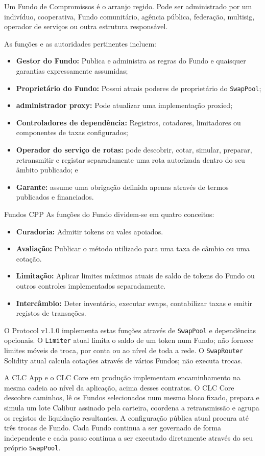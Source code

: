 \documentclass[11pt]{article}
\begin{document}
Um Fundo de Compromissos é o arranjo regido. Pode ser administrado por um indivíduo, cooperativa, Fundo comunitário, agência pública, federação, multisig, operador de serviços ou outra estrutura responsável.

As funções e as autoridades pertinentes incluem:

\begin{itemize}[leftmargin=*]
\item \textbf{Gestor do Fundo:} Publica e administra as regras do Fundo e quaisquer garantias expressamente assumidas;
\item \textbf{Proprietário do Fundo:} Possui atuais poderes de proprietário do \texttt{SwapPool};
\item \textbf{administrador proxy:} Pode atualizar uma implementação proxied;
\item \textbf{Controladores de dependência:} Registros, cotadores, limitadores ou componentes de taxas configurados;
\item \textbf{Operador do serviço de rotas:} pode descobrir, cotar, simular, preparar, retransmitir e registar separadamente uma rota autorizada dentro do seu âmbito publicado; e
\item \textbf{Garante:} assume uma obrigação definida apenas através de termos publicados e financiados.
\end{itemize}
Fundos CPP As funções do Fundo dividem-se em quatro conceitos:

\begin{itemize}[leftmargin=*]
\item \textbf{Curadoria:} Admitir tokens ou vales apoiados.
\item \textbf{Avaliação:} Publicar o método utilizado para uma taxa de câmbio ou uma cotação.
\item \textbf{Limitação:} Aplicar limites máximos atuais de saldo de tokens do Fundo ou outros controles implementados separadamente.
\item \textbf{Intercâmbio:} Deter inventário, executar swaps, contabilizar taxas e emitir registos de transações.
\end{itemize}
O Protocol v1.1.0 implementa estas funções através de \texttt{SwapPool} e dependências opcionais. O \texttt{Limiter} atual limita o saldo de um token num Fundo; não fornece limites móveis de troca, por conta ou ao nível de toda a rede. O \texttt{SwapRouter} Solidity atual calcula cotações através de vários Fundos; não executa trocas.

A CLC App e o CLC Core em produção implementam encaminhamento na mesma cadeia ao nível da aplicação, acima desses contratos. O CLC Core descobre caminhos, lê os Fundos selecionados num mesmo bloco fixado, prepara e simula um lote Calibur assinado pela carteira, coordena a retransmissão e agrupa os registos de liquidação resultantes. A configuração pública atual procura até três trocas de Fundo. Cada Fundo continua a ser governado de forma independente e cada passo continua a ser executado diretamente através do seu próprio \texttt{SwapPool}.
\end{document}

